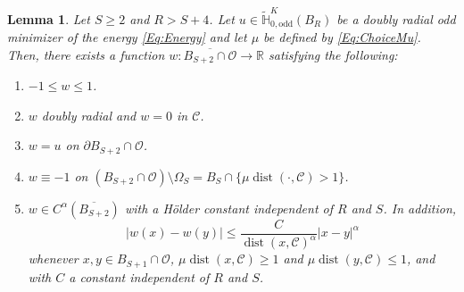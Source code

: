 \documentclass[12pt,reqno]{amsart}
\newtheorem{lemma}[theorem]{Lemma}
\theoremstyle{definition}
\theoremstyle{remark}
\newcommand{\con}[1]{\mathbb{#1}}
\newcommand{\R}{\con{R}} %
\renewcommand{\H}{\con{H}}
\newcommand{\ccal}{\mathscr{C}}
\newcommand{\ocal}{\mathcal{O}}
\DeclareMathOperator{\dist}{dist}
\numberwithin{equation}{section}
\begin{document}
\begin{lemma}
	\label{Lemma:ExistenceCompetitor}
	Let $S\geq 2$ and $R > S + 4$. Let $u\in \widetilde{\H}^K_{0, \mathrm{odd}}(B_R)$ be a doubly radial odd minimizer of the energy \eqref{Eq:Energy} and let $\mu$ be defined by \eqref{Eq:ChoiceMu}. Then, there exists  a function $w:\overline{ B_{S+2}\cap \ocal} \to \R$ satisfying the following:
	
	\begin{enumerate}[label={\normalfont (\textcolor{red}{H\arabic*})}, ref=H\arabic*]
		\item
		\label{Eq:wH1} $-1 \leq w \leq 1$.
		\item
		\label{Eq:wH2} $w$ doubly radial and $w=0$ in $\ccal$.
		\item
		\label{Eq:wH3} $w=u$ on $\partial B_{S+2} \cap \ocal$.
		\item
		\label{Eq:wH4} $w\equiv-1$ on $(B_{S+2}\cap \ocal)\setminus \Omega_S = B_S \cap \{ \mu \dist (\cdot, \ccal) > 1\}$.
		\item
		\label{Eq:wH5} $w\in C^\alpha(\overline{B_{S+2}})$ with a Hölder constant independent of $R$ and $S$. In addition, 
		\begin{equation}
			\label{Eq:wH5Lipschitz}
			|w(x)-w(y)| \leq \frac{C}{\dist(x,\ccal)^\alpha}|x-y|^\alpha			
		\end{equation}
		whenever $x,y \in B_{S+1}\cap \ocal$, $\mu \dist(x,\ccal)\geq 1$ and $\mu \dist(y,\ccal)\leq 1$, and with $C$ a constant independent of $R$ and $S$.
	\end{enumerate} 
\end{lemma}
\end{document}
